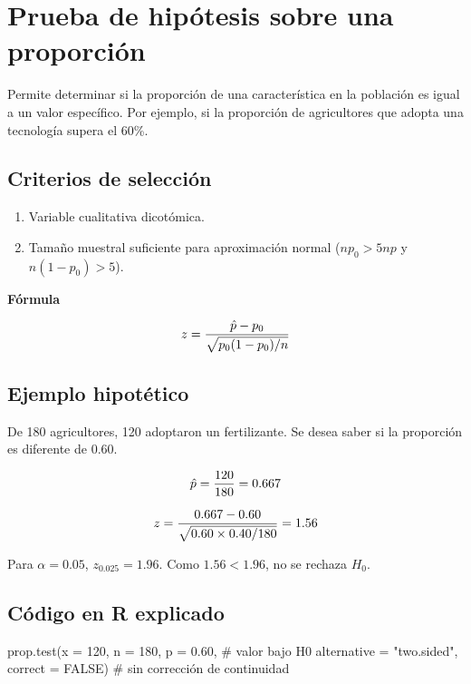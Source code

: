 \documentclass[
  spanish,
  letterpaper,
]{book}
\newenvironment{Shaded}{\begin{snugshade}}{\end{snugshade}}
\newcommand{\AttributeTok}[1]{\textcolor[rgb]{0.40,0.45,0.13}{#1}}
\newcommand{\CommentTok}[1]{\textcolor[rgb]{0.37,0.37,0.37}{#1}}
\newcommand{\ConstantTok}[1]{\textcolor[rgb]{0.56,0.35,0.01}{#1}}
\newcommand{\DecValTok}[1]{\textcolor[rgb]{0.68,0.00,0.00}{#1}}
\newcommand{\FloatTok}[1]{\textcolor[rgb]{0.68,0.00,0.00}{#1}}
\newcommand{\FunctionTok}[1]{\textcolor[rgb]{0.28,0.35,0.67}{#1}}
\newcommand{\NormalTok}[1]{\textcolor[rgb]{0.00,0.23,0.31}{#1}}
\newcommand{\StringTok}[1]{\textcolor[rgb]{0.13,0.47,0.30}{#1}}
\begin{document}
\section{Prueba de hipótesis sobre una
proporción}\label{prueba-de-hipuxf3tesis-sobre-una-proporciuxf3n}

Permite determinar si la proporción de una característica en la
población es igual a un valor específico. Por ejemplo, si la proporción
de agricultores que adopta una tecnología supera el 60\%.

\subsection{Criterios de selección}\label{criterios-de-selecciuxf3n-2}

\begin{enumerate}
\def\labelenumi{\arabic{enumi}.}
\item
  Variable cualitativa dicotómica.
\item
  Tamaño muestral suficiente para aproximación normal (\(np_0 > 5np\) y
  \(n(1-p_0) > 5\)).
\end{enumerate}

\textbf{Fórmula}

\[\huge z = \frac{\hat{p} - p_0}{\sqrt{p_0(1-p_0)/n}}\]

\subsection{Ejemplo hipotético}\label{ejemplo-hipotuxe9tico-1}

De 180 agricultores, 120 adoptaron un fertilizante. Se desea saber si la
proporción es diferente de 0.60.

\[\LARGE \hat{p} = \frac{120}{180} = 0.667\]

\[\LARGE z = \frac{0.667 - 0.60}{\sqrt{0.60 \times 0.40 / 180}} = 1.56\]

Para \(\alpha = 0.05\), \(z_{0.025} = 1.96\). Como \(1.56 < 1.96\), no
se rechaza \(H_0\).

\subsection{Código en R explicado}\label{cuxf3digo-en-r-explicado-3}

\begin{Shaded}
\begin{Highlighting}[]
\FunctionTok{prop.test}\NormalTok{(}\AttributeTok{x =} \DecValTok{120}\NormalTok{, }\AttributeTok{n =} \DecValTok{180}\NormalTok{,}
          \AttributeTok{p =} \FloatTok{0.60}\NormalTok{,                }\CommentTok{\# valor bajo H0}
          \AttributeTok{alternative =} \StringTok{"two.sided"}\NormalTok{,}
          \AttributeTok{correct =} \ConstantTok{FALSE}\NormalTok{)         }\CommentTok{\# sin corrección de continuidad}
\end{Highlighting}
\end{Shaded}
\end{document}
